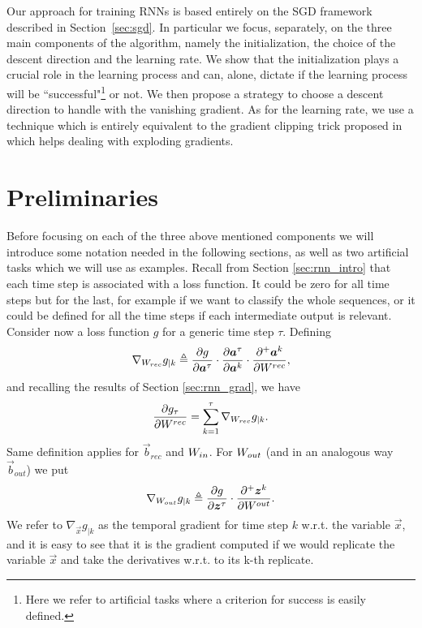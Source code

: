 Our approach for training RNNs is based entirely on the SGD framework described in Section~\ref{sec:sgd}. In particular we focus, separately, on the three main components of the algorithm, namely the initialization, the choice of the descent direction and the learning rate. We show that the initialization plays a crucial role in the learning process and can, alone, dictate if the learning process will be ``successful"\footnote{Here we refer to artificial tasks where a criterion for success is easily defined.} or not. We then propose a strategy to choose a descent direction to handle with the vanishing gradient. As for the learning rate, we use a technique which is entirely equivalent to the gradient clipping trick proposed in \cite{understandingExplodingGradients} which helps dealing with exploding gradients.


\section{Preliminaries}
Before focusing on each of the three above mentioned components we will introduce some notation needed in the following sections, as well as two artificial tasks which we will use as examples.
Recall from Section \ref{sec:rnn_intro} that each time step is associated with a loss function. It could be zero for all time steps but for the last, for example if we want to classify the whole sequences, or it could be defined for all the time steps if each intermediate output is relevant. Consider now a loss function $g$ for a generic time step $\tau$. Defining 
\begin{equation}
\nabla_{W_{rec}} g_{|k}  \triangleq \frac{\partial g}{\partial \boldsymbol{a}^{\tau}} \cdot \frac{\partial \boldsymbol{a}^{\tau}}{\partial \boldsymbol{a}^k} \cdot \frac{\partial^+ \boldsymbol{a}^k}{\partial W^{rec}},
\end{equation}
and recalling the results of Section \ref{sec:rnn_grad}, we have
\begin{equation}
	\frac{\partial g_{\tau}}{\partial W^{rec}} = \sum_{k=1}^{\tau} \nabla_{W_{rec}} g_{|k}.
\end{equation}
Same definition applies for $\vec{b}_{rec}$ and $W_{in}$. For $W_{out}$ (and in an analogous way $\vec{b}_{out}$) we put
\begin{equation}
\nabla_{W_{out}} g_{|k}  \triangleq \frac{\partial g}{\partial \boldsymbol{z}^{\tau}} \cdot \frac{\partial^+ \boldsymbol{z}^k}{\partial W^{out}}.
\end{equation}
We refer to $\nabla_{\vec{x}} g_{|k}$ as the temporal gradient for time step $k$ w.r.t. the variable $\vec{x}$, and it is easy to see that it is the gradient computed if we would replicate the variable $\vec{x}$  and take the derivatives w.r.t. to its k-th replicate.

